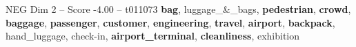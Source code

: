 \begin{textsample}{NEG Dim 2 – Score -4.00 – t011073}  \label{ex:f2_neg_015}
\textbf{bag}, luggage\_\&\_bags, \textbf{pedestrian}, \textbf{crowd}, \textbf{baggage}, \textbf{passenger}, \textbf{customer}, \textbf{engineering}, \textbf{travel}, \textbf{airport}, \textbf{backpack}, hand\_luggage, check-in, \textbf{airport\_terminal}, \textbf{cleanliness}, exhibition

\end{textsample}
